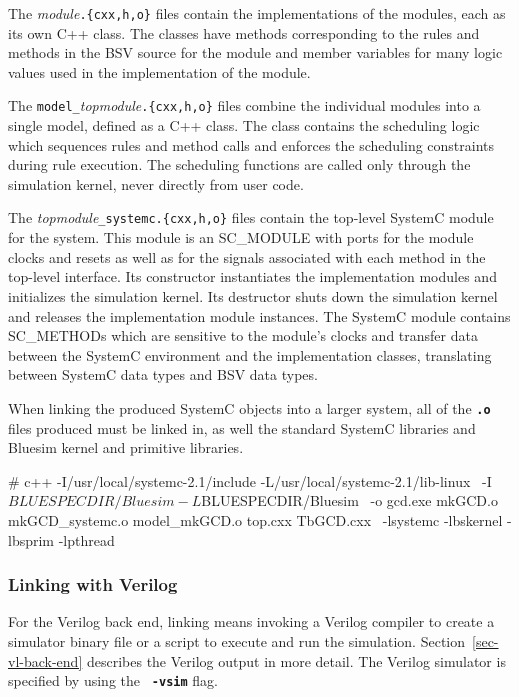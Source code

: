 \documentclass{article}
\newcommand{\te}[1]{\texttt{#1}}
\newenvironment{centerboxverbatim}
  {\center
   \boxedverbatim}
  {\endboxedverbatim
  {\endcenter }}
\begin{document}
The {\em module}\te{.\{cxx,h,o\}} files contain the implementations of the modules,
each as its own C++ class.  The classes have methods corresponding to
the rules and methods in the BSV source for the module and member
variables for many logic values used in the implementation of the
module.

The \te{model\_}{\em topmodule}\te{.\{cxx,h,o\}} files combine the
individual modules into a single model, defined as a C++ class.
The class contains the scheduling logic which
sequences rules and method calls and enforces the scheduling
constraints during rule execution.  The scheduling functions are
called only through the simulation kernel, never directly from user
code.

The {\em topmodule}\te{\_systemc.\{cxx,h,o\}} files contain the
top-level SystemC module
for the system.  This module is an SC\_MODULE with ports for the
module clocks and resets as well as for the signals associated with
each method in the top-level interface.  Its constructor instantiates
the implementation modules and initializes the simulation kernel.
Its destructor shuts down the simulation kernel and releases the
implementation module instances.  The SystemC module contains
SC\_METHODs which are sensitive to the module's clocks and transfer
data between the SystemC environment and the implementation classes,
translating between SystemC data types and BSV data types.

When linking the produced SystemC objects into a larger system, all of
the {\bf\tt .o} files produced must be linked in, as well the standard
SystemC libraries and Bluesim kernel and primitive libraries.

\begin{centerboxverbatim}
# c++ -I/usr/local/systemc-2.1/include -L/usr/local/systemc-2.1/lib-linux \
      -I$BLUESPECDIR/Bluesim -L$BLUESPECDIR/Bluesim \
      -o gcd.exe mkGCD.o mkGCD_systemc.o model_mkGCD.o top.cxx TbGCD.cxx \
      -lsystemc -lbskernel -lbsprim -lpthread
\end{centerboxverbatim}


\subsubsection{Linking with Verilog}
\index{Verilog!simulator}

For the Verilog back end, linking means invoking a Verilog compiler to create a
simulator binary file or a script to execute and run the
simulation. Section~\ref{sec-vl-back-end} describes the Verilog
output  in more
detail.  The Verilog simulator is specified by  using the {\bf\tt
-vsim} flag.
\end{document}
